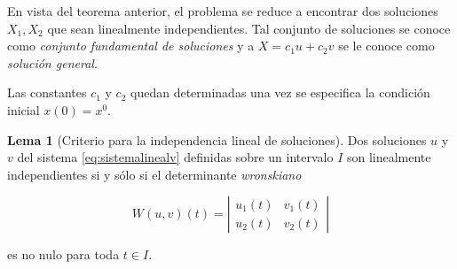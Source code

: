 \documentclass[11pt]{book}
\theoremstyle{definition}
\numberwithin{definition}{section}
\theoremstyle{theorem}
\newtheorem{lemma}{Lema}
\numberwithin{theorem}{section}
\numberwithin{lemma}{section}
\numberwithin{corollary}{section}
\theoremstyle{plain}
\numberwithin{example}{section}
\begin{document}

En vista del teorema anterior, el problema se reduce a encontrar dos soluciones $X_1, X_2$ que sean linealmente independientes. Tal conjunto de soluciones se conoce como \emph{conjunto fundamental de soluciones} y a $X = c_1u + c_2v$ se le conoce como \textit{solución general}.

Las constantes $c_1$ y $c_2$ quedan determinadas una vez se especifica la condición inicial $x(0) = x^0$.

\begin{lemma}[Criterio para la independencia lineal de soluciones]
Dos soluciones $u$ y $v$ del sistema \ref{eq:sistemalinealv} definidas sobre un intervalo $I$ son linealmente independientes si y sólo si el determinante \emph{wronskiano}

$$ W(u,v)(t) = \left|
	\begin{array}{ll}
		u_1(t) & v_1(t) \\
		u_2(t) & v_2(t)
	\end{array}
\right|$$

es no nulo para toda $t \in I$.
\end{lemma}
\end{document}
